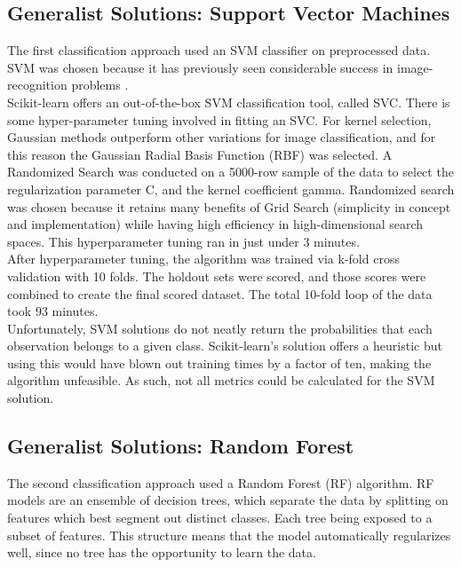 \documentclass[11pt]{article}
\begin{document}
\subsection{Generalist Solutions: Support Vector Machines}
The first classification approach used an SVM classifier on preprocessed data. SVM was chosen because it has previously seen considerable success in image-recognition problems \citep{svmkernels}.\\

Scikit-learn offers an out-of-the-box SVM classification tool, called SVC. There is some hyper-parameter tuning involved in fitting an SVC. For kernel selection, Gaussian methods outperform other variations for image classification\citep{svmkernels}, and for this reason the Gaussian Radial Basis Function (RBF) was selected. A Randomized Search was conducted on a 5000-row sample of the data to select the regularization parameter C, and the kernel coefficient gamma. Randomized search was chosen because it retains many benefits of Grid Search (simplicity in concept and implementation) while having high efficiency in high-dimensional search spaces. This hyperparameter tuning ran in just under 3 minutes.\\

After hyperparameter tuning, the algorithm was trained via k-fold cross validation with 10 folds. The holdout sets were scored, and those scores were combined to create the final scored dataset. The total 10-fold loop of the data took 93 minutes.\\

Unfortunately, SVM solutions do not neatly return the probabilities that each observation belongs to a given class. Scikit-learn's solution offers a heuristic but using this would have blown out training times by a factor of ten, making the algorithm unfeasible. As such, not all metrics could be calculated for the SVM solution.


\subsection{Generalist Solutions: Random Forest}
The second classification approach used a Random Forest (RF) algorithm. RF models are an ensemble of decision trees, which separate the data by splitting on features which best segment out distinct classes. Each tree being exposed to a subset of features. This structure means that the model automatically regularizes well, since no tree has the opportunity to learn the data. \\
\end{document}
